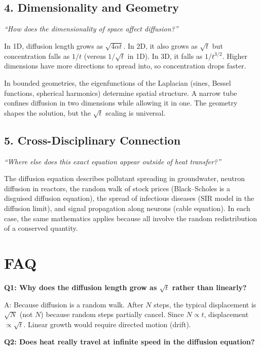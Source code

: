 \subsection*{4. Dimensionality and Geometry}
\textit{``How does the dimensionality of space affect diffusion?''}

In 1D, diffusion length grows as $\sqrt{4\alpha t}$. In 2D, it also grows as $\sqrt{t}$ but concentration falls as $1/t$ (versus $1/\sqrt{t}$ in 1D). In 3D, it falls as $1/t^{3/2}$. Higher dimensions have more directions to spread into, so concentration drops faster.

In bounded geometries, the eigenfunctions of the Laplacian (sines, Bessel functions, spherical harmonics) determine spatial structure. A narrow tube confines diffusion in two dimensions while allowing it in one. The geometry shapes the solution, but the $\sqrt{t}$ scaling is universal.

\subsection*{5. Cross-Disciplinary Connection}
\textit{``Where else does this exact equation appear outside of heat transfer?''}

The diffusion equation describes pollutant spreading in groundwater, neutron diffusion in reactors, the random walk of stock prices (Black--Scholes is a disguised diffusion equation), the spread of infectious diseases (SIR model in the diffusion limit), and signal propagation along neurons (cable equation). In each case, the same mathematics applies because all involve the random redistribution of a conserved quantity.


\section*{FAQ}

\textbf{Q1: Why does the diffusion length grow as $\sqrt{t}$ rather than linearly?}

A: Because diffusion is a random walk. After $N$ steps, the typical displacement is $\sqrt{N}$ (not $N$) because random steps partially cancel. Since $N \propto t$, displacement $\propto \sqrt{t}$. Linear growth would require directed motion (drift).

\textbf{Q2: Does heat really travel at infinite speed in the diffusion equation?}

